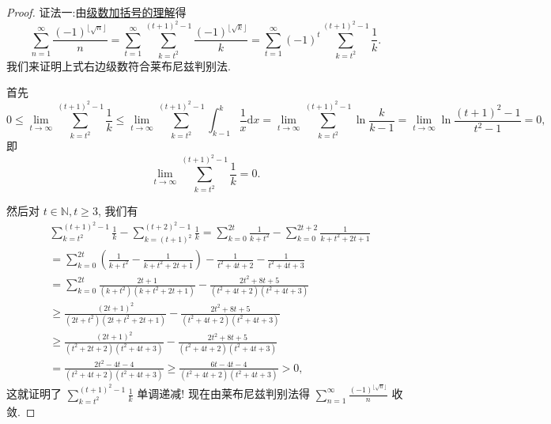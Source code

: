 \documentclass[../../main.tex]{subfiles}
\begin{document}
\begin{proof}
{\color{blue}证法一:}由\hyperref[theorem:级数加括号的理解]{级数加括号的理解}得
\[
\sum_{n=1}^{\infty}{\frac{(-1)^{\lfloor \sqrt{n} \rfloor}}{n}}=\sum_{t=1}^{\infty}{\sum_{k=t^2}^{(t+1)^2-1}{\frac{\left( -1 \right) ^{\lfloor \sqrt{k} \rfloor}}{k}}}=\sum_{t=1}^{\infty}{\left( -1 \right) ^t\sum_{k=t^2}^{(t+1)^2-1}{\frac{1}{k}}}.
\]
我们来证明上式右边级数符合莱布尼兹判别法.

首先
\[
0\leqslant \lim_{t\rightarrow \infty} \sum_{k=t^2}^{(t+1)^2-1}{\frac{1}{k}}\leqslant \lim_{t\rightarrow \infty} \sum_{k=t^2}^{(t+1)^2-1}{\int_{k-1}^k{\frac{1}{x}\mathrm{d}x}}=\lim_{t\rightarrow \infty} \sum_{k=t^2}^{(t+1)^2-1}{\ln \frac{k}{k-1}}=\lim_{t\rightarrow \infty} \ln \frac{(t+1)^2-1}{t^2-1}=0,
\]
即
\[
\lim_{t \to \infty} \sum_{k=t^2}^{(t + 1)^2 - 1} \frac{1}{k} = 0.
\]

然后对 $t \in \mathbb{N}, t \geqslant 3$, 我们有
\begin{align*}
&\sum_{k=t^2}^{(t + 1)^2 - 1} \frac{1}{k} - \sum_{k=(t + 1)^2}^{(t + 2)^2 - 1} \frac{1}{k} = \sum_{k=0}^{2t} \frac{1}{k + t^2} - \sum_{k=0}^{2t + 2} \frac{1}{k + t^2 + 2t + 1} \\
&= \sum_{k=0}^{2t} \left( \frac{1}{k + t^2} - \frac{1}{k + t^2 + 2t + 1} \right) - \frac{1}{t^2 + 4t + 2} - \frac{1}{t^2 + 4t + 3} \\
&= \sum_{k=0}^{2t} \frac{2t + 1}{(k + t^2)(k + t^2 + 2t + 1)} - \frac{2t^2 + 8t + 5}{(t^2 + 4t + 2)(t^2 + 4t + 3)} \\
& \geqslant \frac{(2t + 1)^2}{(2t + t^2)(2t + t^2 + 2t + 1)} - \frac{2t^2 + 8t + 5}{(t^2 + 4t + 2)(t^2 + 4t + 3)} \\
& \geqslant \frac{(2t + 1)^2}{(t^2 + 2t + 2)(t^2 + 4t + 3)} - \frac{2t^2 + 8t + 5}{(t^2 + 4t + 2)(t^2 + 4t + 3)} \\
&= \frac{2t^2 - 4t - 4}{(t^2 + 4t + 2)(t^2 + 4t + 3)} \geqslant \frac{6t - 4t - 4}{(t^2 + 4t + 2)(t^2 + 4t + 3)} > 0,
\end{align*}
这就证明了 $\sum_{k=t^2}^{(t + 1)^2 - 1} \frac{1}{k}$ 单调递减!
现在由莱布尼兹判别法得 $\sum_{n=1}^{\infty} \frac{(-1)^{\lfloor \sqrt{n} \rfloor}}{n}$ 收敛.


\end{proof}
\end{document}
